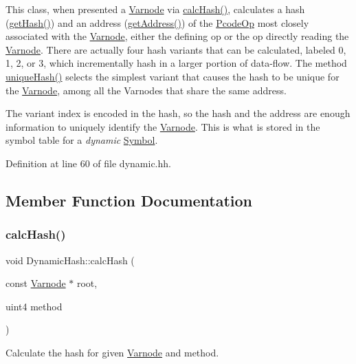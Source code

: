 This class, when presented a \mbox{\hyperlink{class_varnode}{Varnode}} via \mbox{\hyperlink{class_dynamic_hash_ae48f268d1cc95b75aeda1b6d563df0a9}{calc\+Hash()}}, calculates a hash (\mbox{\hyperlink{class_dynamic_hash_ae25a2b1eca6a505bcb4e97b67eb1b2e7}{get\+Hash()}}) and an address (\mbox{\hyperlink{class_dynamic_hash_a304ee882e7ad7f4edd33bda810622cb2}{get\+Address()}}) of the \mbox{\hyperlink{class_pcode_op}{Pcode\+Op}} most closely associated with the \mbox{\hyperlink{class_varnode}{Varnode}}, either the defining op or the op directly reading the \mbox{\hyperlink{class_varnode}{Varnode}}. There are actually four hash variants that can be calculated, labeled 0, 1, 2, or 3, which incrementally hash in a larger portion of data-\/flow. The method \mbox{\hyperlink{class_dynamic_hash_a9255e5fffe4408f9e3f84a3f0847527e}{unique\+Hash()}} selects the simplest variant that causes the hash to be unique for the \mbox{\hyperlink{class_varnode}{Varnode}}, among all the Varnodes that share the same address.

The variant index is encoded in the hash, so the hash and the address are enough information to uniquely identify the \mbox{\hyperlink{class_varnode}{Varnode}}. This is what is stored in the symbol table for a {\itshape dynamic} \mbox{\hyperlink{class_symbol}{Symbol}}. 

Definition at line 60 of file dynamic.\+hh.



\subsection{Member Function Documentation}
\mbox{\label{class_dynamic_hash_ae48f268d1cc95b75aeda1b6d563df0a9}} 
\subsubsection{\texorpdfstring{calcHash()}{calcHash()}}
{\footnotesize\ttfamily void Dynamic\+Hash\+::calc\+Hash (\begin{DoxyParamCaption}\item[{const \mbox{\hyperlink{class_varnode}{Varnode}} $\ast$}]{root,  }\item[{uint4}]{method }\end{DoxyParamCaption})}



Calculate the hash for given \mbox{\hyperlink{class_varnode}{Varnode}} and method. 

